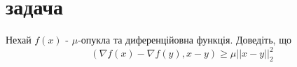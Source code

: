 
\section{задача}


\begin{tcolorbox}[title = Умова]
    Нехай $f(x)$ - $\mu$-опукла та диференційовна функція. Доведіть, що 
    \begin{equation}
        (\nabla f(x) - \nabla f(y), x - y) \geq \mu ||x - y||_2^2
    \end{equation}
\end{tcolorbox}